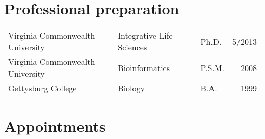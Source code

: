 

\newenvironment{packed_item}{
\begin{itemize}
}{\end{itemize}}




\section{Professional preparation}
\begin{center}
	\begin{tabularx}{\textwidth}{lllr}
	Virginia Commonwealth University & Integrative Life Sciences & Ph.D. & 5/2013\\
	Virginia Commonwealth University & Bioinformatics & P.S.M. & 2008 \\
	Gettysburg College & Biology & B.A. & 1999\\ 
	\end{tabularx}
\end{center}
	
\section{Appointments}

